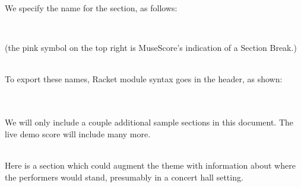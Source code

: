 \documentclass[10pt, sigplan]{acmart}
\begin{document}
We specify the name for the section, as follows:

\hspace*{\fill}\\

(the pink symbol on the top right is MuseScore{'}s indication of a Section Break.)

\hspace*{\fill}\\

To export these names, Racket module syntax goes in the header, as shown:

\hspace*{\fill}\\
\hspace*{\fill}\\

We will only include a couple additional sample sections in this document.
The live demo score will include many more.

\hspace*{\fill}\\

Here is a section which could
augment the theme with information about where the performers would stand,
presumably in a concert hall setting.

\hspace*{\fill}\\
\hspace*{\fill}\\
\end{document}
